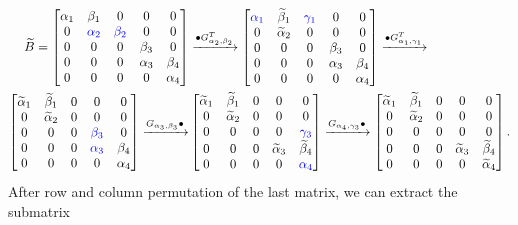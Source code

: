 \documentclass[11pt]{article}
\def \gr {\color{blue}}
\begin{document}
{\scriptsize
	\begin{align*}
		\widetilde{B}=\begin{bmatrix}
		\alpha_1&\beta_1&0&0&0\\
		0& \gr \alpha_2& \gr \beta_2&0&0\\
		0&0&0&\beta_3&0\\
		0&0&0&\alpha_3&\beta_4\\
		0&0&0&0&\alpha_4
		\end{bmatrix}&\xrightarrow{\bullet G_{\alpha_2,\beta_2}^T} \begin{bmatrix}
		\gr \alpha_1&\widetilde{\beta}_1&\gr \gamma_1&0&0\\
		0&\widetilde{\alpha}_2&0&0&0\\
		0&0&0&\beta_3&0\\
		0&0&0&\alpha_3&\beta_4\\
		0&0&0&0&\alpha_4
		\end{bmatrix}\xrightarrow{\bullet  G_{\alpha_1,\gamma_1}^T}\\ 
		\begin{bmatrix}
		\widetilde{\alpha}_1&\widetilde{\beta}_1&0&0&0\\
		0&\widetilde{\alpha}_2&0&0&0\\
		0&0&0&\gr \beta_3&0\\
		0&0&0&\gr \alpha_3&\beta_4\\
		0&0&0&0&\alpha_4
		\end{bmatrix}
		\xrightarrow{G_{\alpha_3,\beta_3}\bullet }&\begin{bmatrix}
		\widetilde{\alpha}_1&\widetilde{\beta}_1&0&0&0\\
		0&\widetilde{\alpha}_2&0&0&0\\
		0&0&0&0&\gr \gamma_3\\
		0&0&0&\widetilde{\alpha}_3&\widetilde{\beta}_4\\
		0&0&0&0&\gr \alpha_4
		\end{bmatrix}\xrightarrow{ G_{\alpha_4,\gamma_3}\bullet }\begin{bmatrix}
		\widetilde{\alpha}_1&\widetilde{\beta}_1&0&0&0\\
		0&\widetilde{\alpha}_2&0&0&0\\
		0&0&0&0&0\\
		0&0&0&\widetilde{\alpha}_3&\widetilde{\beta}_4\\
		0&0&0&0&\widetilde{\alpha}_4
		\end{bmatrix}.
	\end{align*}}
	After row and column permutation of the last matrix, we can extract the submatrix
\end{document}
